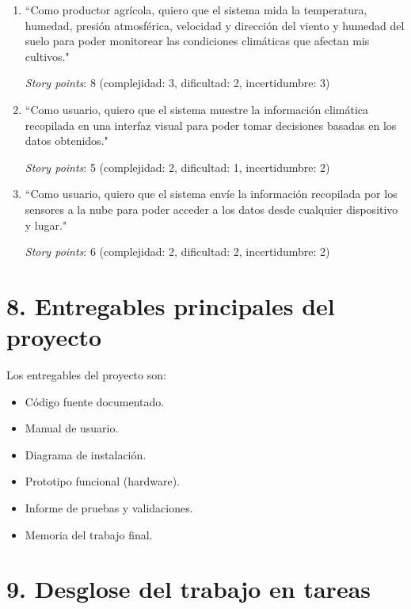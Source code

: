 \documentclass[
11pt, %
]{charter}
\begin{document}
\begin{enumerate}

\item ``Como productor agrícola, quiero que el sistema mida la temperatura, humedad, presión atmosférica, velocidad y dirección del viento y humedad del suelo para poder monitorear las condiciones climáticas que afectan mis cultivos."

\textit{Story points}: 8 (complejidad: 3, dificultad: 2, incertidumbre: 3)

\item ``Como usuario, quiero que el sistema muestre la información climática recopilada en una interfaz visual para poder tomar decisiones basadas en los datos obtenidos."

\textit{Story points}: 5 (complejidad: 2, dificultad: 1, incertidumbre: 2)

\item ``Como usuario, quiero que el sistema envíe la información recopilada por los sensores a la nube para poder acceder a los datos desde cualquier dispositivo y lugar."

\textit{Story points}: 6 (complejidad: 2, dificultad: 2, incertidumbre: 2)

\end{enumerate}

\section{8. Entregables principales del proyecto}
\label{sec:entregables}

Los entregables del proyecto son:

\begin{itemize}
	\item Código fuente documentado.
	\item Manual de usuario.
	\item Diagrama de instalación.
	\item Prototipo funcional (hardware).
	\item Informe de pruebas y validaciones.
	\item Memoria del trabajo final.
\end{itemize}

\section{9. Desglose del trabajo en tareas}
\label{sec:wbs}
\end{document}
